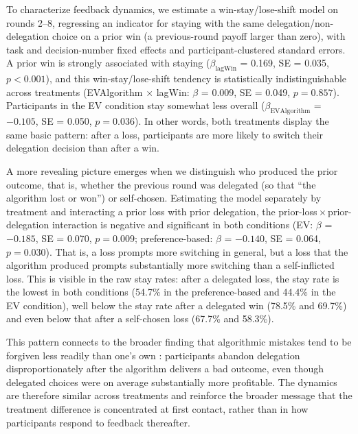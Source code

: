 \documentclass[a4paper, 12pt, fleqn]{article}
\theoremstyle{definition}
\begin{document}
To characterize feedback dynamics, we estimate a win-stay/lose-shift model on rounds 2--8, regressing an indicator for staying with the same delegation/non-delegation choice on a prior win (a previous-round payoff larger than zero), with task and decision-number fixed effects and participant-clustered standard errors. A prior win is strongly associated with staying ($\beta_{\text{lagWin}}$ = 0.169, SE = 0.035, $p < 0.001$), and this win-stay/lose-shift tendency is statistically indistinguishable across treatments (EVAlgorithm $\times$ lagWin: $\beta$ = 0.009, SE = 0.049, $p = 0.857$). Participants in the EV condition stay somewhat less overall ($\beta_{\text{EVAlgorithm}}$ = $-0.105$, SE = 0.050, $p = 0.036$). In other words, both treatments display the same basic pattern: after a loss, participants are more likely to switch their delegation decision than after a win.

A more revealing picture emerges when we distinguish who produced the prior outcome, that is, whether the previous round was delegated (so that ``the algorithm lost or won'') or self-chosen. Estimating the model separately by treatment and interacting a prior loss with prior delegation, the prior-loss\,$\times$\,prior-delegation interaction is negative and significant in both conditions (EV: $\beta$ = $-0.185$, SE = 0.070, $p = 0.009$; preference-based: $\beta$ = $-0.140$, SE = 0.064, $p = 0.030$). That is, a loss prompts more switching in general, but a loss that the algorithm produced prompts substantially more switching than a self-inflicted loss. This is visible in the raw stay rates: after a delegated loss, the stay rate is the lowest in both conditions (54.7\% in the preference-based and 44.4\% in the EV condition), well below the stay rate after a delegated win (78.5\% and 69.7\%) and even below that after a self-chosen loss (67.7\% and 58.3\%). 

This pattern connects to the broader finding that algorithmic mistakes tend to be forgiven less readily than one's own \citep{Dietvorst2018,Renier2021}: participants abandon delegation disproportionately after the algorithm delivers a bad outcome, even though delegated choices were on average substantially more profitable. The dynamics are therefore similar across treatments and reinforce the broader message that the treatment difference is concentrated at first contact, rather than in how participants respond to feedback thereafter.
\end{document}
